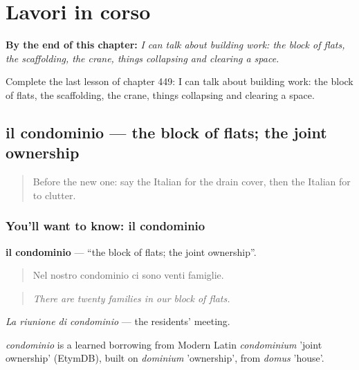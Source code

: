 
\chapter{Lavori in corso}
\label{ch:it-lavori-in-corso}

\begin{chapteropening}
\textbf{By the end of this chapter:} \emph{I can talk about building work: the block of flats, the scaffolding, the crane, things collapsing and clearing a space.}

Complete the last lesson of chapter 449: I can talk about building work: the block of flats, the scaffolding, the crane, things collapsing and clearing a space.
\end{chapteropening}

\section[il condominio]{il condominio — the block of flats; the joint ownership}

\label{lesson:IT-C449-condominio}



\begin{quote}
Before the new one: say the Italian for the drain cover, then the Italian for to clutter.
\end{quote}

\subsection*{You'll want to know: il condominio}
\textbf{il condominio} — \textquotedblleft{}the block of flats; the joint ownership\textquotedblright{}.

\begin{quote}
Nel nostro condominio ci sono venti famiglie.
\end{quote}

\begin{quote}
\emph{There are twenty families in our block of flats.}
\end{quote}

\emph{La riunione di condominio} — the residents' meeting.

\begin{cousinweb}
\emph{condominio} is a learned borrowing from Modern Latin \emph{condominium} 'joint ownership' (EtymDB), built on \emph{dominium} 'ownership', from \emph{domus} 'house'.
\end{cousinweb}

